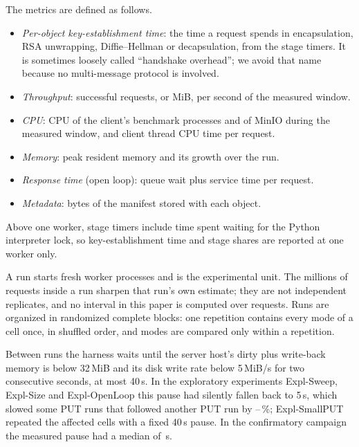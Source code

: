 \documentclass[conference]{IEEEtran}
\newcommand{\lab}[1]{\textsf{#1}}
\begin{document}
The metrics are defined as follows.
\begin{itemize}
\item \emph{Per-object key-establishment time}: the time a request spends in encapsulation, RSA
unwrapping, Diffie--Hellman or decapsulation, from the stage timers. It is sometimes loosely
called ``handshake overhead''; we avoid that name because no multi-message protocol is
involved.
\item \emph{Throughput}: successful requests, or MiB, per second of the measured window.
\item \emph{CPU}: CPU of the client's benchmark processes and of MinIO during the measured
window, and client thread CPU time per request.
\item \emph{Memory}: peak resident memory and its growth over the run.
\item \emph{Response time} (open loop): queue wait plus service time per request.
\item \emph{Metadata}: bytes of the manifest stored with each object.
\end{itemize}
Above one worker, stage timers include time spent waiting for the Python interpreter lock, so
key-establishment time and stage shares are reported at one worker only.

A run starts fresh worker processes and is the experimental unit. The millions of requests inside
a run sharpen that run's own estimate; they are not independent replicates, and no interval in
this paper is computed over requests. Runs are organized in randomized complete blocks: one
repetition contains every mode of a cell once, in shuffled order, and modes are compared only
within a repetition.

Between runs the harness waits until the server host's dirty plus write-back memory is below
32\,MiB and its disk write rate below 5\,MiB/s for two consecutive seconds, at most 40\,s. In the
exploratory experiments \lab{Expl-Sweep}, \lab{Expl-Size} and \lab{Expl-OpenLoop} this pause had silently fallen back to 5\,s, which slowed some PUT runs
that followed another PUT run by \StallSlowMin--\StallSlowMax\,\%; \lab{Expl-SmallPUT} repeated the affected
cells with a fixed 40\,s pause. In the confirmatory campaign the measured pause had a median of
\RevSettleMedian\,s.
\end{document}

